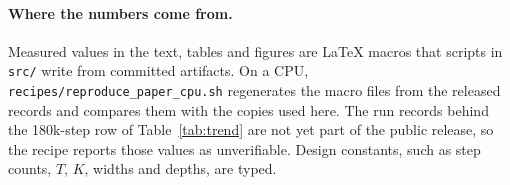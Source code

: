 \paragraph{Where the numbers come from.} Measured values in the text, tables and figures are
LaTeX macros that scripts in \texttt{src/} write from committed artifacts. On a CPU,
\texttt{recipes/reproduce\_paper\_cpu.sh} regenerates the macro files from the released
records and compares them with the copies used here. The run records behind the 180k-step row of Table~\ref{tab:trend} are not yet part of the
public release, so the recipe reports those values as unverifiable.
Design constants, such as step counts, $T$, $K$, widths and depths, are typed.
